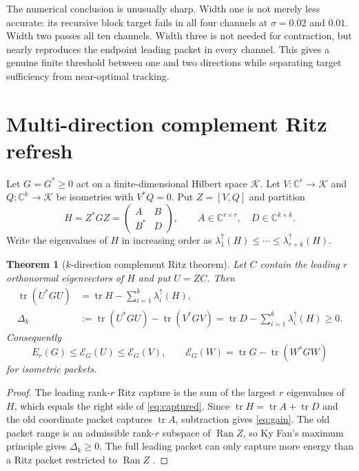 \documentclass[11pt]{article}
\newtheorem{theorem}{Theorem}[section]
\theoremstyle{definition}
\theoremstyle{remark}
\newcommand{\tr}{\operatorname{tr}}
\newcommand{\Ran}{\operatorname{Ran}}
\newcommand{\E}{\mathcal E}
\begin{document}
The numerical conclusion is unusually sharp.  Width one is not merely less
accurate: its recursive block target fails in all four channels at
$\sigma=0.02$ and $0.01$.  Width two passes all ten channels.  Width three is
not needed for contraction, but nearly reproduces the endpoint leading
packet in every channel.  This gives a genuine finite threshold between one
and two directions while separating target sufficiency from near-optimal
tracking.

\section{Multi-direction complement Ritz refresh}
\label{sec:theory}

Let $G=G^*\ge0$ act on a finite-dimensional Hilbert space $\mathcal K$.
Let $V:\mathbb C^r\to\mathcal K$ and
$Q:\mathbb C^k\to\mathcal K$ be isometries with $V^*Q=0$.  Put
$Z=[V,Q]$ and partition
\begin{equation}
 H=Z^*GZ=
 \begin{pmatrix}A&B\\B^*&D\end{pmatrix},
 \qquad A\in\mathbb C^{r\times r},\quad D\in\mathbb C^{k\times k}.
 \label{eq:block}
\end{equation}
Write the eigenvalues of $H$ in increasing order as
$\lambda_1^\uparrow(H)\le\cdots\le\lambda_{r+k}^\uparrow(H)$.

\begin{theorem}[$k$-direction complement Ritz theorem]
\label{thm:k-ritz}
Let $C$ contain the leading $r$ orthonormal eigenvectors of $H$ and put
$U=ZC$.  Then
\begin{align}
 \tr(U^*GU)
 &=\tr H-\sum_{i=1}^k\lambda_i^\uparrow(H),
 \label{eq:captured}\\
 \Delta_k
 &:=\tr(U^*GU)-\tr(V^*GV)
 =\tr D-\sum_{i=1}^k\lambda_i^\uparrow(H)\ge0.
 \label{eq:gain}
\end{align}
Consequently
\begin{equation}
 E_r(G)\le \E_G(U)\le\E_G(V),
 \qquad
 \E_G(W)=\tr G-\tr(W^*GW)
 \label{eq:tail-order}
\end{equation}
for isometric packets.
\end{theorem}

\begin{proof}
The leading rank-$r$ Ritz capture is the sum of the largest $r$ eigenvalues
of $H$, which equals the right side of \eqref{eq:captured}.  Since
$\tr H=\tr A+\tr D$ and the old coordinate packet captures $\tr A$,
subtraction gives \eqref{eq:gain}.  The old packet range is an admissible
rank-$r$ subspace of $\Ran Z$, so Ky Fan's maximum principle gives
$\Delta_k\ge0$.  The full leading packet can only capture more energy than a
Ritz packet restricted to $\Ran Z$ \citep{Fan1949,Bhatia1997}.
\end{proof}
\end{document}
